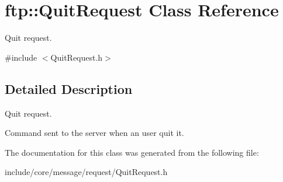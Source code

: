 \hypertarget{classftp_1_1_quit_request}{\section{ftp\-:\-:Quit\-Request Class Reference}
\label{classftp_1_1_quit_request}
}


Quit request.  




{\ttfamily \#include $<$Quit\-Request.\-h$>$}



\subsection{Detailed Description}
Quit request. 

Command sent to the server when an user quit it. 

The documentation for this class was generated from the following file\-:\begin{DoxyCompactItemize}
\item 
include/core/message/request/Quit\-Request.\-h\end{DoxyCompactItemize}
